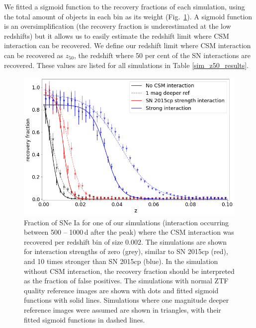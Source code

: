 \documentclass[a4paper,oneside,12pt, class=Latex/Classes/PhDthesisPSnPDF, crop=false]{standalone}
\begin{document}
We fitted a sigmoid function to the recovery fractions of each simulation, using the total amount of objects in each bin as its weight (Fig.~\ref{recov_fracs}). A sigmoid function is an oversimplification (the recovery fraction is underestimated at the low redshifts) but it allows us to easily estimate the redshift limit where CSM interaction can be recovered. We define our redshift limit where CSM interaction can be recovered as $z_{50}$, the redshift where 50 per cent of the SN interactions are recovered. These values are listed for all simulations in Table \ref{sim_z50_results}.


\begin{figure}
 \centering
 \includegraphics[width=\textwidth]{../Images/chapter_3/recov_fracs.png}
 \caption{Fraction of SNe Ia for one of our simulations (interaction occurring between 500 -- 1000\,d after the peak) where the CSM interaction was recovered per redshift bin of size $0.002$. The simulations are shown for interaction strengths of zero (grey), similar to SN 2015cp (red), and 10 times stronger than SN 2015cp (blue). In the simulation without CSM interaction, the recovery fraction should be interpreted as the fraction of false positives. The simulations with normal ZTF quality reference images are shown with dots and fitted sigmoid functions with solid lines. Simulations where one magnitude deeper reference images were assumed are shown in triangles, with their fitted sigmoid functions in dashed lines.}
 \label{recov_fracs}
\end{figure}
\end{document}
